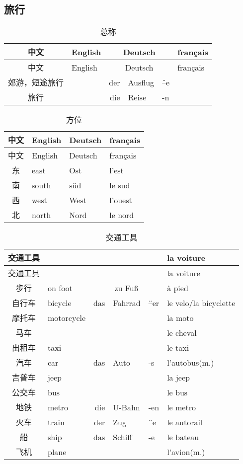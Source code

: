 \documentclass[12pt,A4paper,oneside,reqno]{amsart}
\numberwithin{equation}{section}
\theoremstyle{plain}
\theoremstyle{plain}
\theoremstyle{plain}
\numberwithin{equation}{section}
\theoremstyle{remark}
\begin{document}
\subsection{旅行}\hspace{1cm}
\begin{longtable}{c|l|rll|l}
	\hline
	中文	&	English	&\multicolumn{3}{c|}{Deutsch} &	français  	\\
	\hline
	\endhead
	\hline
	中文	&	English	&\multicolumn{3}{c|}{Deutsch} &	français  	\\
	\hline
	\endfirsthead	
	\hline
	\endfoot
	\hline	
	\caption{总称}
	\endlastfoot				
郊游，短途旅行	&	&	der	&	Ausflug	&	\"{--}e	&		\\
旅行	&	&	die	&	Reise	&	-n	&		\\

	
	
\end{longtable}
\begin{longtable}{c|l|l|l}
	\hline
	中文	&	English	& Deutsch  &	français  	\\
	\hline
	\endhead
	\hline
	中文	&	English	& Deutsch  &	français  	\\
	\hline
	\endfirsthead	
	\hline
	\endfoot
	\hline	
	\caption{方位}
	\endlastfoot				
东	&	east	&	Ost	&	l'est	\\
南	&	south	&	s\"{u}d	&	le sud	\\
西	&	west	&	West	&	l'ouest	\\
北	&	north	&	Nord	&	le nord	\\

\end{longtable}
\begin{longtable}{c|l|rll|l}
	\hline
交通工具	&	&&& &	la voiture  	\\
	\hline
	\endhead
	\hline
交通工具	&	&&& &	la voiture  	\\
	\hline
	\endfirsthead	
	\hline
	\endfoot
	\hline	
	\caption{交通工具}
	\endlastfoot				
步行	&	on foot	&	\multicolumn{3}{c|}{zu Fu\ss} 					&	\`{a} pied	\\
自行车	&	bicycle	&	das	&	Fahrrad	&	\"{--}er	&	le velo/la bicyclette	\\
摩托车	&	motorcycle	&		&		&		&	la moto	\\
马车	&		&		&		&		&	le cheval	\\
出租车	&	taxi	&		&		&		&	le taxi	\\
汽车	&	car	&	das	&	Auto	&	-s	&	l'autobus(m.)	\\
吉普车	&	jeep	&		&		&		&	la jeep	\\
公交车	&	bus	&		&		&		&	le bus	\\
地铁	&	metro	&	die 	&	U-Bahn	&	-en	&	le metro	\\
火车	&	train	&	der	&	Zug	&	\"{--}e	&	le autorail	\\
船	&	ship	&	das	&	Schiff	&	-e	&	le bateau	\\
飞机	&	plane	&		&		&		&	l'avion(m.)	\\

	
\end{longtable}
\end{document}
